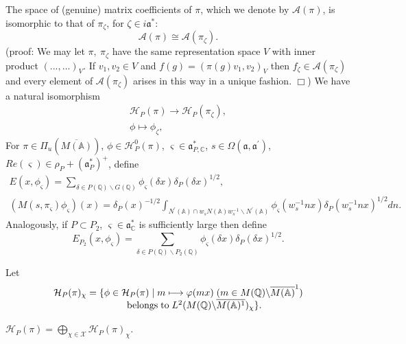 The space of (genuine) matrix coefficients of $\pi$, which we denote by
${\mathcal A}(\pi)$, is isomorphic to that of $\pi_\zeta$, for
$\zeta\in i{\mathfrak{a}}^*$:
$$
{\mathcal A}(\pi)\cong {\mathcal A}(\pi_\zeta).
$$
(proof: We may let $\pi,\ \pi_\zeta$ have the same representation space
$V$ with inner product $(...,...)_V$. If $v_1,v_2\in V$ and
$f(g)=(\pi(g)v_1,v_2)_V$ then $f_\zeta\in {\mathcal A}(\pi_\zeta)$ and every
element of ${\mathcal A}(\pi_\zeta)$ arises in this way in a unique
fashion. $\Box$) We have a natural isomorphism
$$
\begin{array}{c}
{\mathcal H}_P(\pi)\rightarrow {\mathcal H}_P(\pi_\zeta),\\
\phi\longmapsto \phi_\zeta,
\end{array}
$$
For $\pi \in \Pi _u(\overline{M({\mathbb{A}})})$,
$\phi \in {\mathcal H}_P^0(\pi )$,
$\varsigma \in {\mathfrak{a}}_{P,{\mathbb C}}^{*}$,
$s\in \Omega ({\mathfrak{a}},{\mathfrak{a}}^{\prime})$,
$Re(\varsigma )\in \rho _P+({\mathfrak{a}}_P^{*})^{+}$, define
\begin{equation}\label{eq:5.9}
\begin{array}{c}
E(x,\phi _\varsigma )
=\sum_{\delta \in P({\mathbb{Q}})\backslash G({\mathbb{Q}})}
\phi _\varsigma (\delta x)\delta _P(\delta x)^{1/2}, \\
(M(s,\pi _\varsigma )\phi _\varsigma )(x)
=\delta_P(x)^{-1/2}
\int_{N^{\prime }({\mathbb{A}})\cap w_sN({\mathbb{A}})w_s^{-1}\backslash
N^{\prime }({\mathbb{A}})}
\phi _\varsigma (w_s^{-1}nx)\delta_P(w_s^{-1}nx)^{1/2}dn.
\end{array}
\end{equation}
Analogously, if $P\subset P_2$, $\varsigma \in {\mathfrak{a}}_{{\mathbb C}}^{*}$ is
sufficiently large then define
\[
E_{P_2}(x,\phi _\varsigma )
=\sum_{\delta \in P({\mathbb{Q}})\backslash P_2({\mathbb{Q}})}
\phi _\varsigma (\delta x)\delta _P(\delta x)^{1/2}.
\]

Let
\[
\begin{array}{c}
{\mathcal H}_P(\pi )_\chi
=\{\phi \in {\mathcal H}_P(\pi )\;|\;m\longmapsto \varphi (mx)
\;(m\in M({\mathbb{Q}})\backslash \overline{M({\mathbb{A}})}^1) \\
{\rm \;\;\;\;\;\;\;\;\;\;\;\;belongs\;to}
\;L^2(M({\mathbb{Q}})\backslash \overline{M({\mathbb{A}})^1})_\chi \}.
\end{array}
\]

\begin{proposition}\label{prop:5.6}
${\mathcal H}_P(\pi )=\bigoplus_{\chi \in {\mathcal X}}{\mathcal H}_P(\pi )_\chi $.
\end{proposition}

